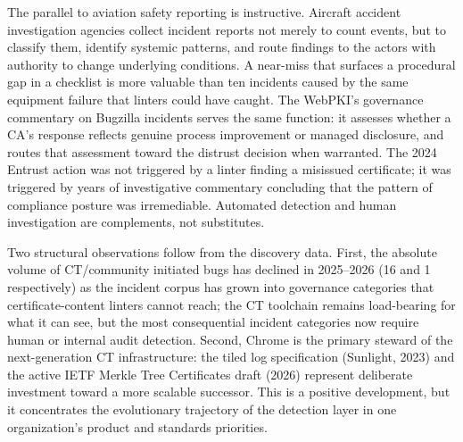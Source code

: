 \documentclass[10pt,twocolumn,letterpaper]{article}
\begin{document}
The parallel to aviation safety reporting is instructive. Aircraft
accident investigation agencies collect incident reports not merely to
count events, but to classify them, identify systemic patterns, and
route findings to the actors with authority to change underlying
conditions. A near-miss that surfaces a procedural gap in a checklist
is more valuable than ten incidents caused by the same equipment
failure that linters could have caught. The WebPKI's governance
commentary on Bugzilla incidents serves the same function: it assesses
whether a CA's response reflects genuine process improvement or managed
disclosure, and routes that assessment toward the distrust decision
when warranted. The 2024 Entrust action was not triggered by a linter
finding a misissued certificate; it was triggered by years of
investigative commentary concluding that the pattern of compliance
posture was irremediable. Automated detection and human investigation
are complements, not substitutes.

Two structural observations follow from the discovery data. First, the
absolute volume of CT/community initiated bugs has declined in
2025--2026 (16 and 1 respectively) as the incident corpus has grown
into governance categories that certificate-content linters cannot
reach; the CT toolchain remains load-bearing for what it can see, but
the most consequential incident categories now require human or
internal audit detection. Second, Chrome is the primary steward of the
next-generation CT infrastructure: the tiled log specification
(Sunlight, 2023) and the active IETF Merkle Tree Certificates draft
(2026) represent deliberate investment toward a more scalable
successor. This is a positive development, but it concentrates the
evolutionary trajectory of the detection layer in one organization's
product and standards priorities.
\end{document}
